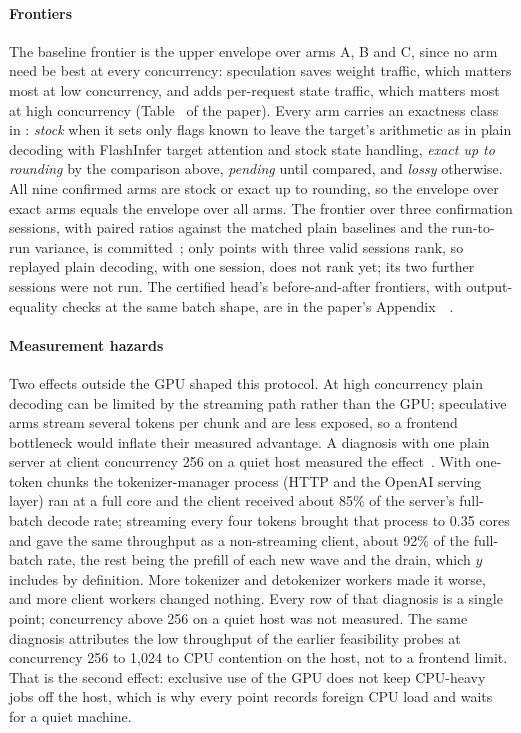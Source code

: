 \paragraph{Frontiers}\label{sec:serving-frontiers} The baseline frontier is the upper envelope over arms A, B and C, since no arm need be best at every concurrency: speculation saves weight traffic, which matters most at low concurrency, and adds per-request state traffic, which matters most at high concurrency (Table~ of the paper). Every arm carries an exactness class in : \emph{stock} when it sets only flags known to leave the target's arithmetic as in plain decoding with FlashInfer target attention and stock state handling, \emph{exact up to rounding} by the comparison above, \emph{pending} until compared, and \emph{lossy} otherwise. All nine confirmed arms are stock or exact up to rounding, so the envelope over exact arms equals the envelope over all arms. The frontier over three confirmation sessions, with paired ratios against the matched plain baselines and the run-to-run variance, is committed~; only points with three valid sessions rank, so replayed plain decoding, with one session, does not rank yet; its two further sessions were not run. The certified head's before-and-after frontiers, with output-equality checks at the same batch shape, are in the paper's Appendix~~.



\paragraph{Measurement hazards}\label{app:serving-hazards}\label{sec:serving-hazards} Two effects outside the GPU shaped this protocol. At high concurrency plain decoding can be limited by the streaming path rather than the GPU; speculative arms stream several tokens per chunk and are less exposed, so a frontend bottleneck would inflate their measured advantage. A diagnosis with one plain server at client concurrency 256 on a quiet host measured the effect~. With one-token chunks the tokenizer-manager process (HTTP and the OpenAI serving layer) ran at a full core and the client received about 85\% of the server's full-batch decode rate; streaming every four tokens brought that process to 0.35 cores and gave the same throughput as a non-streaming client, about 92\% of the full-batch rate, the rest being the prefill of each new wave and the drain, which $y$ includes by definition. More tokenizer and detokenizer workers made it worse, and more client workers changed nothing. Every row of that diagnosis is a single point; concurrency above 256 on a quiet host was not measured. The same diagnosis attributes the low throughput of the earlier feasibility probes at concurrency 256 to 1,024 to CPU contention on the host, not to a frontend limit. That is the second effect: exclusive use of the GPU does not keep CPU-heavy jobs off the host, which is why every point records foreign CPU load and waits for a quiet machine.
